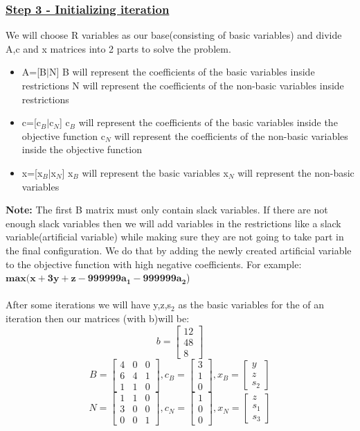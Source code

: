 \subsubsection{\underline{Step 3 - Initializing iteration}}
We will choose R variables as our base(consisting of basic variables) and divide A,c and x matrices into 2 parts to solve the problem.
\begin{itemize}
	\item A=[B$|$N]
		\subitem B will represent the coefficients of the basic variables inside restrictions
		\subitem N will represent the coefficients of the non-basic variables inside restrictions
	\item c=[c$_B$$|$c$_N$]
		\subitem c$_B$ will represent the coefficients of the basic variables inside the objective function
		\subitem c$_N$ will represent the coefficients of the non-basic variables inside the objective function
	\item x=[x$_B$$|$x$_N$]
		\subitem x$_B$ will represent the basic variables
		\subitem x$_N$ will represent the non-basic variables
\end{itemize}
\textbf{Note:} The first B matrix must only contain slack variables. If there are not enough slack variables then we will add variables in the restrictions like a slack variable(artificial variable) while making sure they are not going to take part in the final configuration. We do that by adding the newly created artificial variable to the objective function with high negative coefficients. For example:\\$\mathbf{max(x+3y+z-999999a_1-999999a_2}$) \\
\\
After some iterations we will have y,z,s$_2$ as the basic variables for the of an iteration then our matrices (with b)will be:
\[
b=\begin{bmatrix}
12\\
48\\
8
\end{bmatrix}
\]
\[
B=\begin{bmatrix}
4&0&0\\
6&4&1\\
1&1&0
\end{bmatrix}
,c_B=\begin{bmatrix}
3\\
1\\
0
\end{bmatrix}
,x_B=\begin{bmatrix}
y\\
z\\
s_2
\end{bmatrix}
\]
\[
N=\begin{bmatrix}
1&1&0\\
3&0&0\\
0&0&1
\end{bmatrix}
,c_N=\begin{bmatrix}
1\\
0\\
0
\end{bmatrix}
,x_N=\begin{bmatrix}
z\\
s_1\\
s_3
\end{bmatrix}
\]
